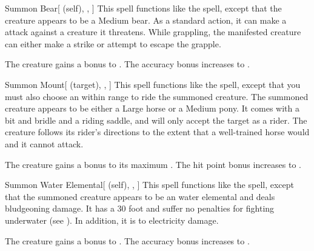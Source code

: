 \lowercase{\hypertarget{spell:Summon Bear}{}}\label{spell:Summon Bear}
\begin{attuneability}[Rank 3]{\hypertarget{spell:Summon Bear}{Summon Bear}}[ (self), , ]
This spell functions like the  spell, except that the creature appears to be a Medium bear.
As a standard action, it can make a  attack against a creature it threatens.
While grappling, the manifested creature can either make a strike or attempt to escape the grapple.

\rankline
{} The creature gains a  bonus to .
 The accuracy bonus increases to .
\end{attuneability}
\vspace{0.25em}



\lowercase{\hypertarget{spell:Summon Mount}{}}\label{spell:Summon Mount}
\begin{attuneability}[Rank 3]{\hypertarget{spell:Summon Mount}{Summon Mount}}[ (target), , ]
This spell functions like the  spell, except that you must also choose an  within \rngmed range to ride the summoned creature.
The summoned creature appears to be either a Large horse or a Medium pony.
It comes with a bit and bridle and a riding saddle, and will only accept the target as a rider.
The creature follows its rider's directions to the extent that a well-trained horse would and it cannot attack.

\rankline
{} The creature gains a  bonus to its maximum .
 The hit point bonus increases to .
\end{attuneability}
\vspace{0.25em}



\lowercase{\hypertarget{spell:Summon Water Elemental}{}}\label{spell:Summon Water Elemental}
\begin{attuneability}[Rank 3]{\hypertarget{spell:Summon Water Elemental}{Summon Water Elemental}}[ (self), , ]
This spell functions like the  spell, except that the summoned creature appears to be an water elemental and deals bludgeoning damage.
It has a 30 foot  and suffer no penalties for fighting underwater (see ).
In addition, it is  to electricity damage.

\rankline
{} The creature gains a  bonus to .
 The accuracy bonus increases to .
\end{attuneability}
\vspace{0.25em}



